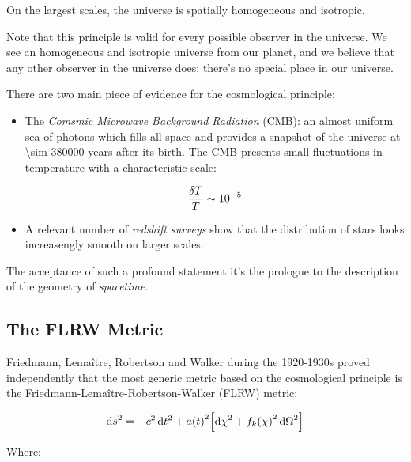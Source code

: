 \begin{principle}
        On the largest scales, the universe is spatially homogeneous and isotropic.
\end{principle}

Note that this principle is valid for every possible observer in the
universe. We see an homogeneous and isotropic universe from our planet, and
we believe that any other observer in the universe does: there's no special
place in our universe.

There are two main piece of evidence for the cosmological principle:

\begin{itemize}
        \item The \emph{Comsmic Microwave Background Radiation} (CMB): an almost
        uniform sea of photons which fills all space and provides a snapshot of the
        universe at \num{\sim 380000} years after its birth. The CMB
        presents small fluctuations in temperature with a characteristic
        scale:

        \begin{equation}
                \frac{\var{T}}{T} \sim \num{e-5}
        \end{equation}

        \item A relevant number of \emph{redshift surveys} show that the
        distribution of stars looks increasengly smooth on larger scales.
\end{itemize}

The acceptance of such a profound statement it's the prologue to the
description of the geometry of \emph{spacetime}. 

\subsection{The FLRW Metric}\label{ss:flrw}

Friedmann, Lema\^itre, Robertson and Walker during the 1920-1930s proved
independently that the most generic metric based on the cosmological
principle is the Friedmann-Lema\^itre-Robertson-Walker (FLRW) metric:

\begin{equation}
        \dd{s}^2 = -c^2\dd{t^2} + a\qty(t)^2\qty[\dd{\chi}^2 +
        f_k\qty(\chi)^2\dd{\Omega}^2]
        \label{eq:flrw}
\end{equation}

Where:

